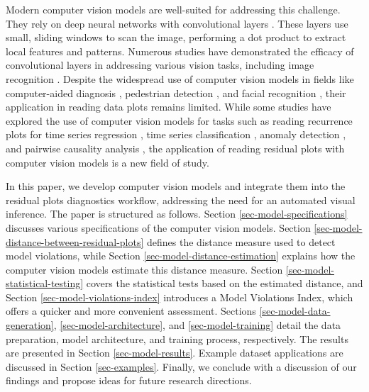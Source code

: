 \documentclass[]{interact}
\theoremstyle{plain}%
\theoremstyle{definition}
\theoremstyle{remark}
\begin{document}
Modern computer vision models are well-suited for addressing this
challenge. They rely on deep neural networks with convolutional layers
\citep{fukushima1982neocognitron}. These layers use small, sliding
windows to scan the image, performing a dot product to extract local
features and patterns. Numerous studies have demonstrated the efficacy
of convolutional layers in addressing various vision tasks, including
image recognition \citep{rawat2017deep}. Despite the widespread use of
computer vision models in fields like computer-aided diagnosis
\citep{lee2015image}, pedestrian detection \citep{brunetti2018computer},
and facial recognition \citep{emami2012facial}, their application in
reading data plots remains limited. While some studies have explored the
use of computer vision models for tasks such as reading recurrence plots
for time series regression \citep{ojeda2020multivariate}, time series
classification
\citep{chu2019automatic, hailesilassie2019financial, hatami2018classification, zhang2020encoding},
anomaly detection \citep{chen2020convolutional}, and pairwise causality
analysis \citep{singh2017deep}, the application of reading residual
plots with computer vision models is a new field of study.

In this paper, we develop computer vision models and integrate them into
the residual plots diagnostics workflow, addressing the need for an
automated visual inference. The paper is structured as follows. Section
\ref{sec-model-specifications} discusses various specifications of the
computer vision models. Section
\ref{sec-model-distance-between-residual-plots} defines the distance
measure used to detect model violations, while Section
\ref{sec-model-distance-estimation} explains how the computer vision
models estimate this distance measure. Section
\ref{sec-model-statistical-testing} covers the statistical tests based
on the estimated distance, and Section \ref{sec-model-violations-index}
introduces a Model Violations Index, which offers a quicker and more
convenient assessment. Sections \ref{sec-model-data-generation},
\ref{sec-model-architecture}, and \ref{sec-model-training} detail the
data preparation, model architecture, and training process,
respectively. The results are presented in Section
\ref{sec-model-results}. Example dataset applications are discussed in
Section \ref{sec-examples}. Finally, we conclude with a discussion of
our findings and propose ideas for future research directions.
\end{document}
